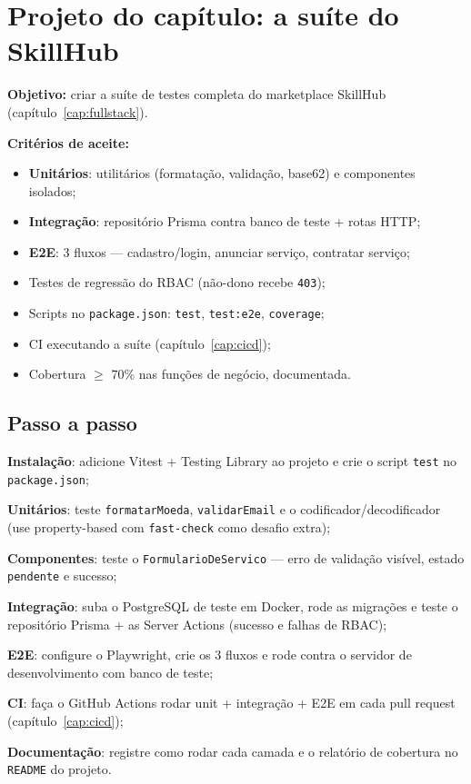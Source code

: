 \section{Projeto do capítulo: a suíte do SkillHub}
\label{sec:projeto16}

\begin{caixaprojeto}
\textbf{Objetivo:} criar a suíte de testes completa do marketplace SkillHub
(capítulo~\ref{cap:fullstack}).

\textbf{Critérios de aceite:}
\begin{itemize}[leftmargin=*, itemsep=0.2em]
  \item \textbf{Unitários}: utilitários (formatação, validação, base62) e componentes isolados;
  \item \textbf{Integração}: repositório Prisma contra banco de teste + rotas HTTP;
  \item \textbf{E2E}: 3 fluxos — cadastro/login, anunciar serviço, contratar serviço;
  \item Testes de regressão do RBAC (não-dono recebe \texttt{403});
  \item Scripts no \texttt{package.json}: \texttt{test}, \texttt{test:e2e}, \texttt{coverage};
  \item CI executando a suíte (capítulo~\ref{cap:cicd});
  \item Cobertura $\geq$ 70\% nas funções de negócio, documentada.
\end{itemize}
\end{caixaprojeto}

\subsection{Passo a passo}

\begin{passos}
  \item \textbf{Instalação}: adicione Vitest + Testing Library ao projeto e crie
  o script \texttt{test} no \texttt{package.json};
  \item \textbf{Unitários}: teste \texttt{formatarMoeda}, \texttt{validarEmail}
  e o codificador/decodificador (use property-based com \texttt{fast-check}
  como desafio extra);
  \item \textbf{Componentes}: teste o \texttt{FormularioDeServico} — erro de
  validação visível, estado \texttt{pendente} e sucesso;
  \item \textbf{Integração}: suba o PostgreSQL de teste em Docker, rode as
  migrações e teste o repositório Prisma + as Server Actions (sucesso e
  falhas de RBAC);
  \item \textbf{E2E}: configure o Playwright, crie os 3 fluxos e rode contra o
  servidor de desenvolvimento com banco de teste;
  \item \textbf{CI}: faça o GitHub Actions rodar unit + integração + E2E em
  cada pull request (capítulo~\ref{cap:cicd});
  \item \textbf{Documentação}: registre como rodar cada camada e o relatório
  de cobertura no \texttt{README} do projeto.
\end{passos}

